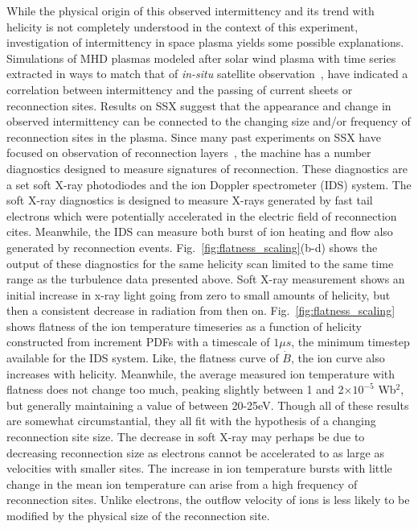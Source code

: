 \documentclass[aip,prl,amsmath,amssymb,reprint,superscriptaddress]{revtex4-1} %
\begin{document}
While the physical origin of this observed intermittency and its trend with helicity is not completely understood in the context of this experiment, investigation of intermittency in space plasma yields some possible explanations. Simulations of MHD plasmas modeled after solar wind plasma with time series extracted in ways to match that of \textit{in-situ} satellite observation~\cite{Greco08,Servidio09,Greco09}, have indicated a correlation between intermittency and the passing of current sheets or reconnection sites. Results on SSX suggest that the appearance and change in observed intermittency can be connected to the changing size and/or frequency of reconnection sites in the plasma. Since many past experiments on SSX have focused on observation of reconnection layers~\cite{Gray10}, the machine has a number diagnostics designed to measure signatures of reconnection. These diagnostics are a set soft X-ray photodiodes and the ion Doppler spectrometer (IDS) system. The soft X-ray diagnostics is designed to measure X-rays generated by fast tail electrons which were potentially accelerated in the electric field of reconnection cites. Meanwhile, the IDS can measure both burst of ion heating and flow also generated by reconnection events. Fig.~\ref{fig:flatness_scaling}(b-d) shows the output of these diagnostics for the same helicity scan limited to the same time range as the turbulence data presented above. Soft X-ray measurement shows an initial increase in x-ray light going from zero to small amounts of helicity, but then a consistent decrease in radiation from then on. Fig.~\ref{fig:flatness_scaling} shows flatness of the ion temperature timeseries as a function of helicity constructed from increment PDFs with a timescale of $1\mu s$, the minimum timestep available for the IDS system. Like, the flatness curve of $\dot{B}$, the ion curve also increases with helicity. Meanwhile, the average measured ion temperature with flatness does not change too much, peaking slightly between 1 and 2$\times 10^{-5}$ Wb$^{2}$, but generally maintaining a value of between 20-25eV. Though all of these results are somewhat circumstantial, they all fit with the hypothesis of a changing reconnection site size. The decrease in soft X-ray may perhaps be due to decreasing reconnection size as electrons cannot be accelerated to as large as velocities with smaller sites. The increase in ion temperature bursts with little change in the mean ion temperature can arise from a high frequency of reconnection sites. Unlike electrons, the outflow velocity of ions is less likely to be modified by the physical size of the reconnection site. 
\end{document}
